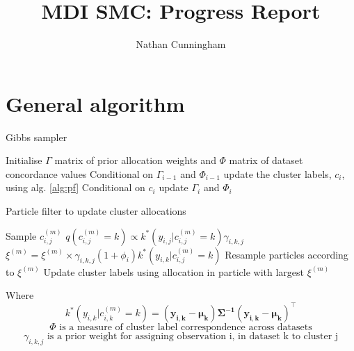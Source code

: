 \documentclass[10pt,a4paper]{article}
\author{Nathan Cunningham}
\title{MDI SMC: Progress Report}
\begin{document}
\maketitle

\section*{General algorithm}
\begin{algorithm}
\caption{Gibbs sampler}
 \begin{algorithmic}[1]
  \State Initialise $\Gamma$ matrix of prior allocation weights and $\Phi$ matrix of dataset concordance values
  \State Conditional on $\Gamma_{i-1}$ and $\Phi_{i-1}$ update the cluster labels, $c_{i}$, using alg. \ref{alg:pf}
  \State Conditional on $c_{i}$ update $\Gamma_i$ and $\Phi_i$
  \EndFor
\end{algorithmic}
\end{algorithm}


\begin{algorithm}
\caption{Particle filter to update cluster allocations}
\label{alg:pf}
 \begin{algorithmic}[1]
   
   
   
  \State Sample $c^{(m)}_{i, j}$ 
  \State $q(c^{(m)}_{i,j} = k) \propto k^*(y_{i,j}|c_{i,j}^{(m)} = k) \gamma_{i, k, j}$ 
  \State $\xi^{(m)} =  \xi^{(m)} \times \gamma_{i, k, j}(1+\phi_{i})k^*(y_{i,k}|c_{i,j}^{(m)} = k)$ 
  \EndFor
  \EndFor
  \State Resample particles according to $\xi^{(m)}$
  \EndFor
  \State Update cluster labels using allocation in particle with largest $\xi^{(m)}$

\end{algorithmic}
\end{algorithm}

Where
\begin{equation}
\label{eq:likelihood}
k^*(y_{i, k}|c_{i, k}^{(m)} = k) = (\mathbf{y_{i, k}} - \mathbf{\mu_k}) \mathbf{\Sigma^{-1}} (\mathbf{y_{i, k}} - \mathbf{\mu_k})^\top
\end{equation}
\begin{equation}
\label{eq:phi}
\Phi \text{ is a measure of cluster label correspondence across datasets}
\end{equation}
\begin{equation}
\label{eq:gamma}
\gamma_{i, k, j} \text{ is a prior weight for assigning observation i, in dataset k to cluster j}
\end{equation}
\end{document}
